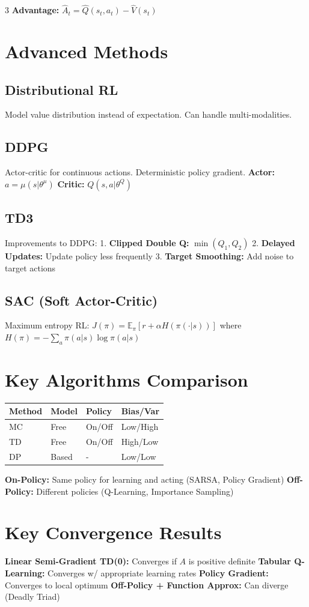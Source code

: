 \documentclass[8pt,landscape,a4paper]{article}
\begin{document}
\begin{multicols*}{3}
\textbf{Advantage:} $\hat{A}_t = \hat{Q}(s_t,a_t) - \hat{V}(s_t)$

\section{Advanced Methods}
\subsection{Distributional RL}
Model value distribution instead of expectation. Can handle multi-modalities.

\subsection{DDPG}
Actor-critic for continuous actions. Deterministic policy gradient.
\textbf{Actor:} $a = \mu(s|\theta^\mu)$
\textbf{Critic:} $Q(s,a|\theta^Q)$

\subsection{TD3}
Improvements to DDPG:
1. \textbf{Clipped Double Q:} $\min(Q_1, Q_2)$
2. \textbf{Delayed Updates:} Update policy less frequently
3. \textbf{Target Smoothing:} Add noise to target actions

\subsection{SAC (Soft Actor-Critic)}
Maximum entropy RL: $J(\pi) = \mathbb{E}_\pi[r + \alpha H(\pi(\cdot|s))]$
where $H(\pi) = -\sum_a \pi(a|s) \log \pi(a|s)$

\section{Key Algorithms Comparison}
\begin{tabular}{|l|l|l|l|}
\hline
\textbf{Method} & \textbf{Model} & \textbf{Policy} & \textbf{Bias/Var} \\
\hline
MC & Free & On/Off & Low/High \\
TD & Free & On/Off & High/Low \\
DP & Based & - & Low/Low \\
\hline
\end{tabular}

\textbf{On-Policy:} Same policy for learning and acting (SARSA, Policy Gradient)
\textbf{Off-Policy:} Different policies (Q-Learning, Importance Sampling)

\section{Key Convergence Results}
\textbf{Linear Semi-Gradient TD(0):} Converges if $A$ is positive definite
\textbf{Tabular Q-Learning:} Converges w/ appropriate learning rates
\textbf{Policy Gradient:} Converges to local optimum
\textbf{Off-Policy + Function Approx:} Can diverge (Deadly Triad)

\end{multicols*}
\end{document}
